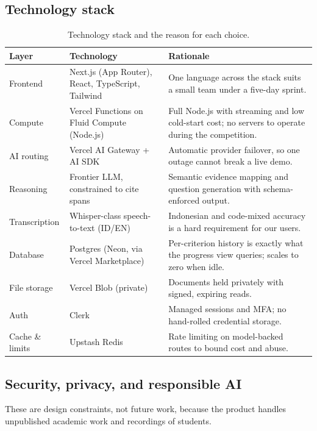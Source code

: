 \subsection{Technology stack}

\begin{table}[htbp]
\centering
\caption{Technology stack and the reason for each choice.}
\label{tab:stack}
{\fontsize{9.5}{11.2}\selectfont
\begin{tabularx}{\textwidth}{@{}L{2.2cm} L{4.1cm} X@{}}
\toprule
\textbf{Layer} & \textbf{Technology} & \textbf{Rationale} \\
\midrule
Frontend & Next.js (App Router), React, TypeScript, Tailwind &
One language across the stack suits a small team under a five-day sprint. \\
Compute & Vercel Functions on Fluid Compute (Node.js) &
Full Node.js with streaming and low cold-start cost; no servers to operate
during the competition. \\
AI routing & Vercel AI Gateway + AI SDK &
Automatic provider failover, so one outage cannot break a live demo. \\
Reasoning & Frontier LLM, constrained to cite spans &
Semantic evidence mapping and question generation with schema-enforced output. \\
Transcription & Whisper-class speech-to-text (ID/EN) &
Indonesian and code-mixed accuracy is a hard requirement for our users. \\
Database & Postgres (Neon, via Vercel Marketplace) &
Per-criterion history is exactly what the progress view queries; scales to
zero when idle. \\
File storage & Vercel Blob (private) &
Documents held privately with signed, expiring reads. \\
Auth & Clerk &
Managed sessions and MFA; no hand-rolled credential storage. \\
Cache \& limits & Upstash Redis &
Rate limiting on model-backed routes to bound cost and abuse. \\
\bottomrule
\end{tabularx}}
\end{table}

\subsection{Security, privacy, and responsible AI}

These are design constraints, not future work, because the product handles
unpublished academic work and recordings of students.


